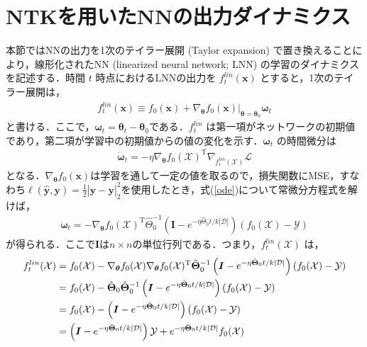 \section{NTKを用いたNNの出力ダイナミクス}
\label{NTK_dynamics}
本節ではNNの出力を1次のテイラー展開 (Taylor expansion) で置き換えることにより，線形化されたNN (linearized neural network; LNN) の学習のダイナミクスを記述する．時間 $t$ 時点におけるLNNの出力を $f_t^{lin}(\bm{x})$ とすると，1次のテイラー展開は，
\begin{align}
    f_t^{lin}(\bm{x}) \equiv f_0(\bm{x}) + \nabla_{\bm{\theta}}f_0(\bm{x})|_{\bm{\theta}=\bm{\theta}_0}\bm{\omega}_t \label{f_t_lin}
\end{align}
と書ける．ここで，$\bm{\omega}_t=\bm{\theta}_t - \bm{\theta}_0$である．$f_t^{lin}$ は第一項がネットワークの初期値であり，第二項が学習中の初期値からの値の変化を示す．$\bm{\omega}_t$ の時間微分は
\begin{align}
    \dot{\bm{\omega}}_t = -\eta \nabla_{\bm{\theta}}f_0(\mathcal{X})^{\mathrm{T}}\nabla_{f_t^{lin}(\mathcal{X})}\mathcal{L} \label{ode}
\end{align}
となる．$\nabla_{\bm{\theta}}f_0(\bm{x})$は学習を通して一定の値を取るので，損失関数にMSE，すなわち$\ell(\hat{\bm{y}},\bm{y}) = \frac{1}{2}|\hat{\bm{y}}-\bm{y}|_2^2$を使用したとき，式(\ref{ode})について常微分方程式を解けば，
\begin{align}
    \bm{\omega}_t = -\nabla_{\bm{\theta}}f_0(\mathcal{X})^{\mathrm{T}}\hat{\Theta}_{0}^{-1}\left(\bm{I} - e^{-\eta\hat{\Theta}_0 t/k|\mathcal{D}|}\right)(f_0(\mathcal{X})- \mathcal{Y})
\end{align}
が得られる．ここで$\bm{I}$は$n \times n$の単位行列である．つまり，$f_t^{lin}(\mathcal{X})$ は，
\begin{align}
    f_t^{lin}(\mathcal{X}) &= f_0(\mathcal{X}) - \nabla_{\bm{\theta}}f_0(\mathcal{X})\nabla_{\bm{\theta}}f_0(\mathcal{X})^{\mathrm{T}}\hat{\bm{\Theta}}_{0}^{-1}\left(\bm{I} - e^{-\eta\hat{\bm{\Theta}}_0 t/k|\mathcal{D}|}\right)(f_0(\mathcal{X})- \mathcal{Y}) \\
    &= f_0(\mathcal{X}) - \hat{\bm{\Theta}}_0 \hat{\bm{\Theta}}_0^{-1}\left(\bm{I} - e^{-\eta\hat{\bm{\Theta}}_0 t/k|\mathcal{D}|}\right)(f_0(\mathcal{X})- \mathcal{Y}) \\
    &= f_0(\mathcal{X}) - \left(\bm{I} - e^{-\eta\hat{\bm{\Theta}}_0 t/k|\mathcal{D}|}\right)(f_0(\mathcal{X})- \mathcal{Y}) \\
    &= \left(\bm{I} - e^{-\eta\hat{\bm{\Theta}}_0 t/k|\mathcal{D}|}\right)\mathcal{Y} + e^{-\eta\hat{\bm{\Theta}}_0 t/k|\mathcal{D}|}f_0(\mathcal{X}) \label{ntk_output}
\end{align}
